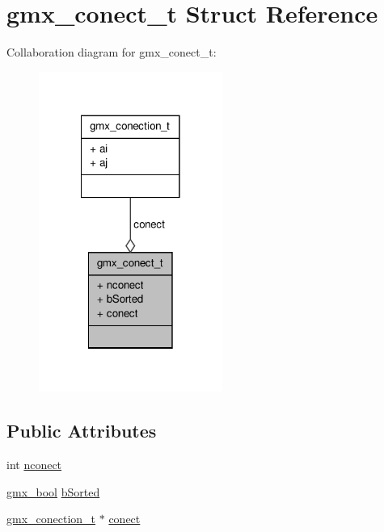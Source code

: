 \hypertarget{structgmx__conect__t}{\section{gmx\-\_\-conect\-\_\-t \-Struct \-Reference}
\label{structgmx__conect__t}
}


\-Collaboration diagram for gmx\-\_\-conect\-\_\-t\-:
\nopagebreak
\begin{figure}[H]
\begin{center}
\leavevmode
\includegraphics[width=170pt]{structgmx__conect__t__coll__graph}
\end{center}
\end{figure}
\subsection*{\-Public \-Attributes}
\begin{DoxyCompactItemize}
\item 
int \hyperlink{structgmx__conect__t_a1227b37b863596d73a32deda7be4017e}{nconect}
\item 
\hyperlink{include_2types_2simple_8h_a8fddad319f226e856400d190198d5151}{gmx\-\_\-bool} \hyperlink{structgmx__conect__t_a40a79f3b8bd15bbf6fc659367b4c889a}{b\-Sorted}
\item 
\hyperlink{structgmx__conection__t}{gmx\-\_\-conection\-\_\-t} $\ast$ \hyperlink{structgmx__conect__t_ab8fa72455f10e672302577d549f9beab}{conect}
\end{DoxyCompactItemize}


